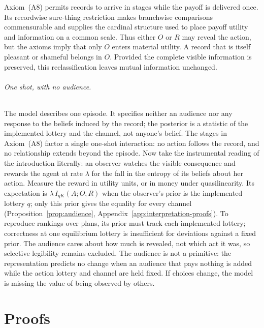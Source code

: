 \documentclass[11pt,a4paper]{article}
\theoremstyle{definition}
\newcommand{\I}{I}
\newcommand{\1}{\mathbf 1}
\begin{document}
 Axiom~\textup{(A8)} permits records to arrive in stages while the payoff is delivered once.  Its recordwise sure-thing restriction makes branchwise comparisons commensurable and supplies the cardinal structure used to place payoff utility and information on a common scale.  Thus either $O$ or $R$ may reveal the action, but the axioms imply that only
$O$ enters material utility.  A record
that is itself pleasant or shameful belongs in $O$.  Provided the complete visible information is preserved, this reclassification leaves mutual information unchanged.




\paragraph{One shot, with no audience.}
The model describes one episode.  It specifies neither an audience nor any response to the beliefs induced by
the record; the posterior is a statistic of the implemented lottery and the channel, not anyone's belief.  The
stages in Axiom~\textup{(A8)} factor a single one-shot interaction: no action follows the record, and no relationship
extends beyond the episode.  Now take the instrumental reading of the introduction literally: an observer
watches the visible consequence and rewards the agent at rate $\lambda$ for the fall in the entropy of its beliefs about her action. Measure the reward in utility units, or in money under quasilinearity. Its expectation is $\lambda\,\I_{qK}(A;O,R)$ when the observer's prior is the implemented lottery $q$; only this prior gives the equality for every channel (Proposition~\ref{prop:audience}, Appendix~\ref{app:interpretation-proofs}). To reproduce rankings over plans, its prior must track each implemented lottery; correctness at one equilibrium lottery is insufficient for deviations against a fixed prior. The audience cares about how much is revealed, not which act it was, so selective legibility remains excluded.  The audience
is not a primitive: the representation predicts no change when an audience that pays nothing is added while the action
lottery and channel are held fixed.  If choices change, the model is missing the value of being observed by
others.

\clearpage
\appendix

\part*{Proofs}
\end{document}
